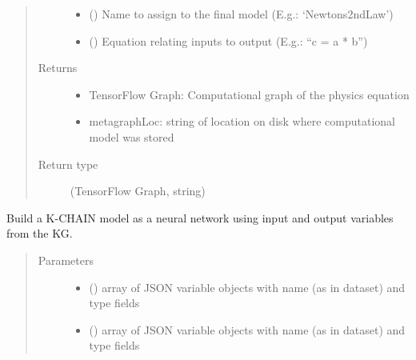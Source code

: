 \documentclass[letterpaper,10pt,english]{sphinxmanual}
\begin{document}
\begin{fulllineitems}
\begin{fulllineitems}
\begin{quote}
\begin{description}
\begin{itemize}
\item {} 
 () \textendash{} Name to assign to the final model (E.g.: ‘Newtons2ndLaw’)

\item {} 
 () \textendash{} Equation relating inputs to output (E.g.: “c = a * b”)

\end{itemize}

\item[{Returns}] \leavevmode
\begin{itemize}
\item {} 
TensorFlow Graph: Computational graph of the physics equation

\item {} 
metagraphLoc: string of location on disk where computational model was stored

\end{itemize}


\item[{Return type}] \leavevmode
(TensorFlow Graph, string)

\end{description}\end{quote}

\end{fulllineitems}


\begin{fulllineitems}
\label{\detokenize{index:kChain.kChainModel._createNNModel}}
Build a K-CHAIN model as a neural network using input and output
variables from the KG.
\begin{quote}\begin{description}
\item[{Parameters}] \leavevmode\begin{itemize}
\item {} 
 () \textendash{} array of JSON variable objects with name (as in dataset) and type fields

\item {} 
 () \textendash{} array of JSON variable objects with name (as in dataset) and type fields


\end{itemize}
\end{description}
\end{quote}
\end{fulllineitems}
\end{fulllineitems}
\end{document}

